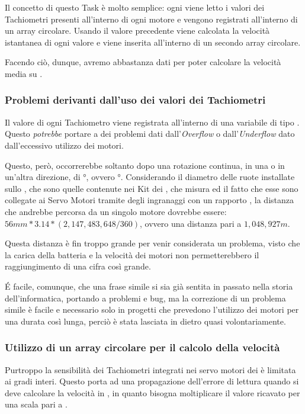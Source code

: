 Il concetto di questo Task è molto semplice: ogni  viene letto i valori
dei Tachiometri presenti all'interno di ogni motore e vengono registrati
all'interno di un array circolare. Usando il valore precedente viene
calcolata la velocità istantanea di ogni valore e viene inserita
all'interno di un secondo array circolare.

Facendo ciò, dunque, avremo abbastanza dati per poter calcolare la velocità
media su .

\subsubsection{Problemi derivanti dall'uso dei valori dei Tachiometri}
Il valore di ogni Tachiometro viene registrata all'interno di una variabile
di tipo . Questo \emph{potrebbe} portare a dei problemi
dati dall'\emph{Overflow} o dall'\emph{Underflow} dato dall'eccessivo
utilizzo dei motori.

Questo, però, occorrerebbe soltanto dopo una rotazione continua, in una o
in un'altra direzione, di °, ovvero
°. Considerando il diametro delle ruote installate
sullo \SPAM{}, che sono quelle contenute nei Kit  dei
\nxt{}, che misura \cypher{56mm} ed il fatto che esse sono collegate ai
Servo Motori tramite degli ingranaggi con un rapporto , la
distanza che andrebbe percorsa da un singolo motore dovrebbe essere: $56mm
* 3.14 * (2,147,483,648 / 360)$, ovvero una distanza pari a $1,048,927m$.

Questa distanza è fin troppo grande per venir considerata un problema,
visto che la carica della batteria e la velocità dei motori non
permetterebbero il raggiungimento di una cifra così grande.

\'E facile, comunque, che una frase simile si sia già sentita in passato nella
storia dell'informatica, portando a problemi e bug, ma la correzione di un
problema simile è facile e necessario solo in progetti che prevedono
l'utilizzo dei motori per una durata così lunga, perciò è stata lasciata in
dietro quasi volontariamente.

\subsubsection{Utilizzo di un array circolare per il calcolo della velocità}
Purtroppo la sensibilità dei Tachiometri integrati nei servo motori dei
\nxt{} è limitata ai gradi interi. Questo porta ad una propagazione
dell'errore di lettura quando si deve calcolare la velocità in
, in quanto bisogna moltiplicare il valore
ricavato per una scala pari a .

